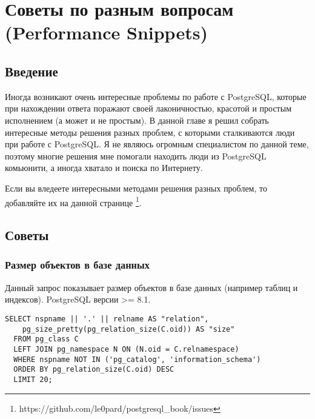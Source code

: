 \chapter{Советы по разным вопросам (Performance Snippets)}
\begin{epigraphs}
\end{epigraphs}

\section{Введение}
Иногда возникают очень интересные проблемы по работе с PostgreSQL, которые при нахождении ответа поражают своей лаконичностью, 
красотой и простым исполнением (а может и не простым). В данной главе я решил собрать интересные методы решения разных проблем, с 
которыми сталкиваются люди при работе с PostgreSQL. Я не являюсь огромным специалистом по данной теме, поэтому многие решения 
мне помогали находить люди из PostgreSQL комьюнити, а иногда хватало и поиска по Интернету. 

Если вы вледеете интересными методами решения разных проблем, то добавляйте их на данной странице 
\footnote{https://github.com/le0pard/postgresql\_book/issues}.

\section{Советы}

\subsection{Размер объектов в базе данных}

\begin{framed}
Данный запрос показывает размер объектов в базе данных (например таблиц и индексов). PostgreSQL версии >= 8.1.
\end{framed}

\begin{lstlisting}[label=lst:snippets1,caption=Поиск самых больших объектов в БД. SQL запрос]
SELECT nspname || '.' || relname AS "relation",
    pg_size_pretty(pg_relation_size(C.oid)) AS "size"
  FROM pg_class C
  LEFT JOIN pg_namespace N ON (N.oid = C.relnamespace)
  WHERE nspname NOT IN ('pg_catalog', 'information_schema')
  ORDER BY pg_relation_size(C.oid) DESC
  LIMIT 20;
\end{lstlisting}


